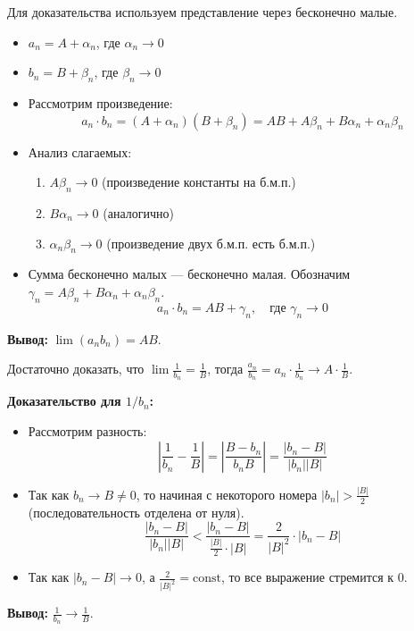\begin{tcolorbox}[title=2. Предел произведения]
    Для доказательства используем представление через бесконечно малые.
    \begin{itemize}
        \item $a_n = A + \alpha_n$, где $\alpha_n \to 0$
        \item $b_n = B + \beta_n$, где $\beta_n \to 0$
        \item Рассмотрим произведение:
        $$ a_n \cdot b_n = (A + \alpha_n)(B + \beta_n) = AB + A\beta_n + B\alpha_n + \alpha_n\beta_n $$
        \item Анализ слагаемых:
        \begin{enumerate}
            \item $A\beta_n \to 0$ (произведение константы на б.м.п.)
            \item $B\alpha_n \to 0$ (аналогично)
            \item $\alpha_n\beta_n \to 0$ (произведение двух б.м.п. есть б.м.п.)
        \end{enumerate}
        \item Сумма бесконечно малых — бесконечно малая. Обозначим $\gamma_n = A\beta_n + B\alpha_n + \alpha_n\beta_n$.
        $$ a_n \cdot b_n = AB + \gamma_n, \quad \text{где } \gamma_n \to 0 $$
    \end{itemize}
    \textbf{Вывод:} $\lim (a_n b_n) = AB$.
\end{tcolorbox}

\begin{tcolorbox}[title=3. Предел частного]
    Достаточно доказать, что $\lim \frac{1}{b_n} = \frac{1}{B}$, тогда $\frac{a_n}{b_n} = a_n \cdot \frac{1}{b_n} \to A \cdot \frac{1}{B}$.
    
    \textbf{Доказательство для $1/b_n$:}
    \begin{itemize}
        \item Рассмотрим разность:
        $$ \left| \frac{1}{b_n} - \frac{1}{B} \right| = \left| \frac{B - b_n}{b_n B} \right| = \frac{|b_n - B|}{|b_n| |B|} $$
        \item Так как $b_n \to B \neq 0$, то начиная с некоторого номера $|b_n| > \frac{|B|}{2}$ (последовательность отделена от нуля).
        $$ \frac{|b_n - B|}{|b_n| |B|} < \frac{|b_n - B|}{\frac{|B|}{2} \cdot |B|} = \frac{2}{|B|^2} \cdot |b_n - B| $$
        \item Так как $|b_n - B| \to 0$, а $\frac{2}{|B|^2} = \text{const}$, то все выражение стремится к 0.
    \end{itemize}
    \textbf{Вывод:} $\frac{1}{b_n} \to \frac{1}{B}$.
\end{tcolorbox}
